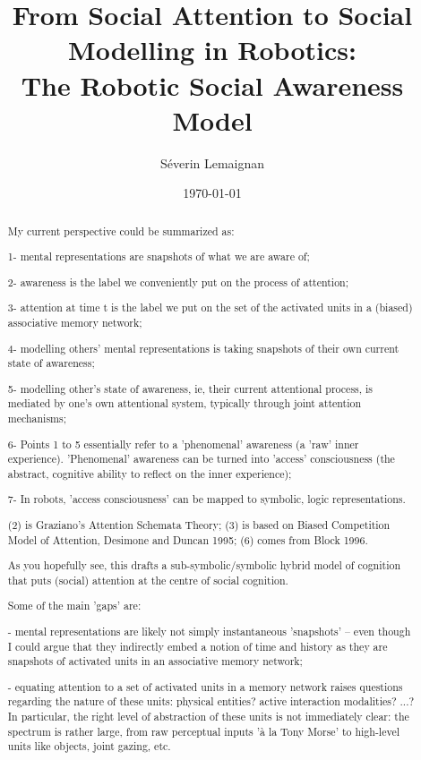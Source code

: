 \documentclass[a4paper]{article}
\title{From Social Attention to Social Modelling in Robotics:\\ The Robotic Social Awareness Model}
\author{Séverin Lemaignan}
\date{\today}
\begin{document}
\maketitle

\begin{abstract}

My current perspective could be summarized as:

1- mental representations are snapshots of what we are aware of;

2- awareness is the label we conveniently put on the process of attention;

3- attention at time t is the label we put on the set of the activated units in
a (biased) associative memory network;

4- modelling others’ mental representations is taking snapshots of their own
current state of awareness;

5- modelling other’s state of awareness, ie, their current attentional process,
is mediated by one’s own attentional system, typically through joint attention
mechanisms;

6- Points 1 to 5 essentially refer to a 'phenomenal' awareness (a 'raw' inner
experience). 'Phenomenal' awareness can be turned into 'access' consciousness
(the abstract, cognitive ability to reflect on the inner experience);

7- In robots, 'access consciousness' can be mapped to symbolic, logic
representations.

(2) is Graziano's Attention Schemata Theory; (3) is based on Biased Competition
Model of Attention, Desimone and Duncan 1995; (6) comes from Block 1996.

As you hopefully see, this drafts a sub-symbolic/symbolic hybrid model of
cognition that puts (social) attention at the centre of social cognition.

Some of the main 'gaps' are:

- mental representations are likely not simply instantaneous 'snapshots' --
even though I could argue that they indirectly embed a notion of time and
history as they are snapshots of activated units in an associative memory
network;

- equating attention to a set of activated units in a memory network raises
questions regarding the nature of these units: physical entities? active
interaction modalities? ...? In particular, the right level of abstraction of
these units is not immediately clear: the spectrum is rather large, from raw
perceptual inputs 'à la Tony Morse' to high-level units like objects, joint
gazing, etc.


\end{abstract}
\end{document}
